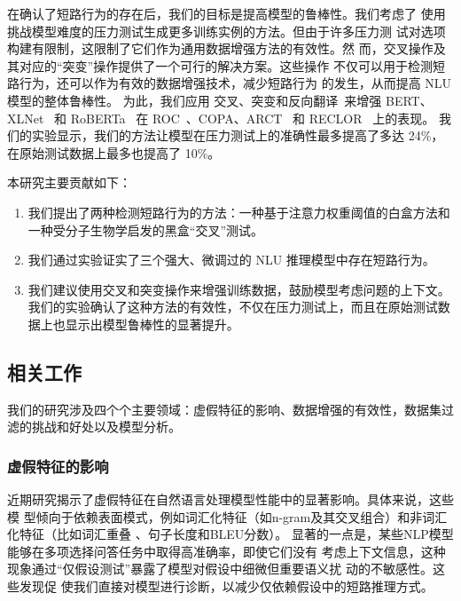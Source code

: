 在确认了短路行为的存在后，我们的目标是提高模型的鲁棒性。我们考虑了
使用挑战模型难度的压力测试生成更多训练实例的方法。但由于许多压力测
试对选项构建有限制，这限制了它们作为通用数据增强方法的有效性。然
而，交叉操作及其对应的``突变''操作提供了一个可行的解决方案。这些操作
不仅可以用于检测短路行为，还可以作为有效的数据增强技术，减少短路行为
的发生，从而提高 NLU 模型的整体鲁棒性。
为此，我们应用
交叉、突变和反向翻译~\cite{xie2020unsupervised}来增强 BERT、XLNet~\cite{yang2019xlnet} 和 RoBERTa~\cite{liu2019roberta} 在 ROC~\cite{mostafazadeh2016corpus}、COPA、ARCT~\cite{habernal2018argument} 和 RECLOR~\cite{yu2020reclor} 上的表现。
我们的实验显示，我们的方法让模型在压力测试上的准确性最多提高了多达 24\%，在原始测试数据上最多也提高了 10\%。

本研究主要贡献如下：

\begin{enumerate}
\item 我们提出了两种检测短路行为的方法：一种基于注意力权重阈值的白盒方法和一种受分子生物学启发的黑盒``交叉''测试。
\item 我们通过实验证实了三个强大、微调过的 NLU 推理模型中存在短路行为。
\item 我们建议使用交叉和突变操作来增强训练数据，鼓励模型考虑问题的上下文。我们的实验确认了这种方法的有效性，不仅在压力测试上，而且在原始测试数据上也显示出模型鲁棒性的显著提升。
\end{enumerate}

\subsection{相关工作}
\label{sec3:related}
我们的研究涉及四个个主要领域：虚假特征的影响、数据增强的有效性，数据集过滤的挑战和好处以及模型分析。

\subsubsection*{虚假特征的影响}
近期研究揭示了虚假特征在自然语言处理模型性能中的显著影响。具体来说，这些模
型倾向于依赖表面模式，例如词汇化特征（如n-gram及其交叉组合）和非词汇化特征（比如词汇重叠
、句子长度和BLEU分数）\cite{sharma2018tackling,srinivasan2018simple,zellers2018swag,bowman2015large,naik2018stress,joshi2022all}。
显著的一点是，某些NLP模型能够在多项选择问答任务中取得高准确率，即使它们没有
考虑上下文信息，这种现象通过``仅假设测试''暴露了模型对假设中细微但重要语义扰
动的不敏感性\cite{sanchez2018behavior,izmailov2022feature}。这些发现促
使我们直接对模型进行诊断，以减少仅依赖假设中的短路推理方式。

